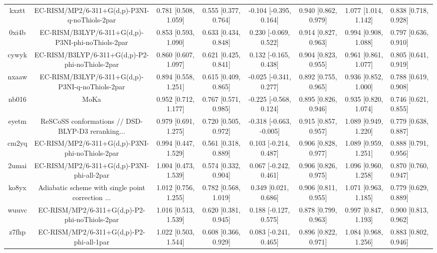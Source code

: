 \documentclass{article}
\begin{document}
\begin{center}
\begin{longtable}{|ccccccc|}
 kxztt &      EC-RISM/MP2/6-311+G(d,p)-P3NI-q-noThiols-2par &  0.781 [0.508, 1.059] &  0.555 [0.377, 0.764] &   -0.104 [-0.395, 0.164] &  0.940 [0.862, 0.979] &   1.077 [1.014, 1.142] &  0.838 [0.718, 0.928] \\
 0xi4b &  EC-RISM/B3LYP/6-311+G(d,p)-P3NI-phi-noThiols-2par &  0.853 [0.593, 1.090] &  0.633 [0.434, 0.848] &    0.230 [-0.069, 0.522] &  0.914 [0.827, 0.963] &   0.994 [0.908, 1.088] &  0.797 [0.636, 0.910] \\
 cywyk &    EC-RISM/B3LYP/6-311+G(d,p)-P2-phi-noThiols-2par &  0.860 [0.607, 1.097] &  0.621 [0.425, 0.841] &    0.132 [-0.165, 0.438] &  0.904 [0.823, 0.955] &   0.961 [0.861, 1.077] &  0.805 [0.641, 0.919] \\
 nxaaw &    EC-RISM/B3LYP/6-311+G(d,p)-P3NI-q-noThiols-2par &  0.894 [0.558, 1.251] &  0.615 [0.409, 0.865] &   -0.025 [-0.341, 0.277] &  0.892 [0.755, 0.965] &   0.936 [0.852, 1.000] &  0.788 [0.619, 0.908] \\
 nb016 &                                               MoKa &  0.952 [0.712, 1.177] &  0.767 [0.571, 0.985] &   -0.225 [-0.568, 0.124] &  0.895 [0.826, 0.946] &   0.935 [0.820, 1.074] &  0.746 [0.621, 0.855] \\
 eyetm &  ReSCoSS conformations // DSD-BLYP-D3 reranking... &  0.979 [0.691, 1.275] &  0.720 [0.505, 0.972] &  -0.318 [-0.663, -0.005] &  0.915 [0.857, 0.957] &   1.089 [0.949, 1.220] &  0.779 [0.638, 0.887] \\
 cm2yq &    EC-RISM/MP2/6-311+G(d,p)-P3NI-phi-noThiols-2par &  0.994 [0.447, 1.529] &  0.561 [0.318, 0.889] &    0.103 [-0.214, 0.487] &  0.906 [0.828, 0.977] &   1.089 [0.959, 1.251] &  0.888 [0.791, 0.956] \\
 2umai &         EC-RISM/MP2/6-311+G(d,p)-P3NI-phi-all-2par &  1.004 [0.473, 1.539] &  0.574 [0.332, 0.904] &    0.067 [-0.242, 0.461] &  0.906 [0.826, 0.975] &   1.096 [0.960, 1.258] &  0.870 [0.760, 0.947] \\
 ko8yx &  Adiabatic scheme with single point correction ... &  1.012 [0.756, 1.255] &  0.782 [0.568, 1.019] &     0.349 [0.021, 0.686] &  0.906 [0.811, 0.955] &   1.071 [0.963, 1.185] &  0.779 [0.629, 0.889] \\
 wuuvc &      EC-RISM/MP2/6-311+G(d,p)-P2-phi-noThiols-2par &  1.016 [0.513, 1.539] &  0.620 [0.381, 0.945] &    0.188 [-0.127, 0.575] &  0.878 [0.799, 0.963] &   0.997 [0.847, 1.193] &  0.900 [0.813, 0.962] \\
 z7fhp &           EC-RISM/MP2/6-311+G(d,p)-P2-phi-all-1par &  1.022 [0.503, 1.544] &  0.608 [0.366, 0.929] &    0.083 [-0.241, 0.465] &  0.896 [0.822, 0.971] &   1.084 [0.968, 1.256] &  0.883 [0.802, 0.946] \\

\end{longtable}
\end{center}
\end{document}
